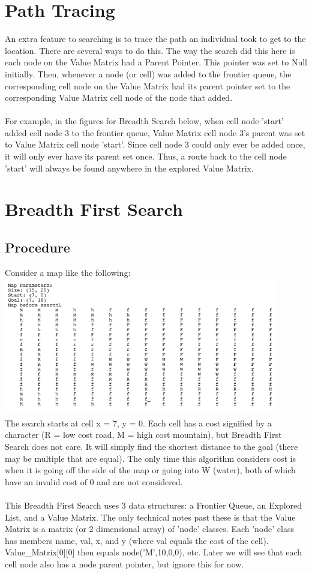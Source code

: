 \documentclass[12pt]{article}
\begin{document}
\section{Path Tracing}
An extra feature to searching is to trace the path an individual took to get to the location. There are several ways to do this. The way the search did this here is each node on the Value Matrix had a Parent Pointer. This pointer was set to Null initially. Then, whenever a node (or cell) was added to the frontier queue, the corresponding cell node on the Value Matrix had its parent pointer set to the corresponding Value Matrix cell node of the node that added.
	\\ \\
For example, in the figures for Breadth Search below, when cell node 'start' added cell node 3 to the frontier queue, Value Matrix cell node 3's parent was set to Value Matrix cell node 'start'. Since cell node 3 could only ever be added once, it will only ever have its parent set once. Thus, a route back to the cell node 'start' will always be found anywhere in the explored Value Matrix.

\section{Breadth First Search}
	\subsection{Procedure}
	Consider a map like the following:
	\\
	\includegraphics[width=120mm,height=60mm]{images/init_map.png}
	\\
	The search starts at cell x = 7, y = 0. Each cell has a cost signified by a character (R = low cost road, M = high cost mountain), but Breadth First Search does not care. It will simply find the shortest distance to the goal (there may be multiple that are equal). The only time this algorithm considers cost is when it is going off the side of the map or going into W (water), both of which have an invalid cost of 0 and are not considered.
	\\ \\
	This Breadth First Search uses 3 data structures: a Frontier Queue, an Explored List, and a Value Matrix. The only technical notes past these is that the Value Matrix is a matrix (or 2 dimensional array) of 'node' classes. Each 'node' class has members name, val, x, and y (where val equals the cost of the cell). Value\_Matrix[0][0] then equals node('M',10,0,0), etc. Later we will see that each cell node also has a node parent pointer, but ignore this for now.
 
\end{document}
